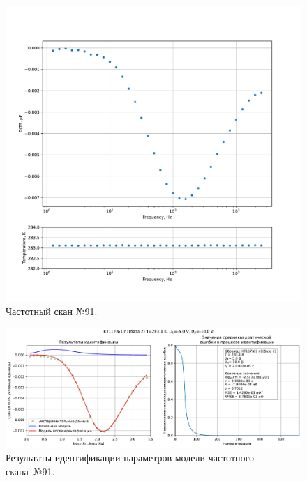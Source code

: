 \begin{figure}[!ht]
    \centering
    \includegraphics[width=1\textwidth]{../plots/КТ117№1_п1(база 2)_2500Гц-1Гц_1пФ_+10С_-5В-10В_100мВ_20мкс_шаг_0,1.pdf}
    \caption{Частотный скан №91.}
    \label{pic:frequency_scan_91}
\end{figure}

\begin{figure}[!ht]
    \centering
    \includegraphics[width=1\textwidth]{../plots/КТ117№1_п1(база 2)_2500Гц-1Гц_1пФ_+10С_-5В-10В_100мВ_20мкс_шаг_0,1_model.pdf}
    \caption{Результаты идентификации параметров модели частотного скана~№91.}
    \label{pic:frequency_scan_model91}
\end{figure}

\pagebreak



